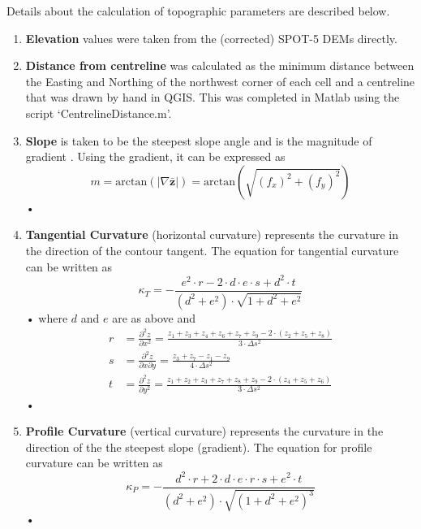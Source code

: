 \documentclass[12pt]{article}
\renewcommand{\vector}[1]{\mathbf{#1}}
\begin{document}
Details about the calculation of topographic parameters are described below.
\begin{enumerate}
\item[]\textbf{Elevation} values were taken from the (corrected) SPOT-5 DEMs directly.

\item[] \textbf{Distance from centreline} was calculated as the minimum distance between the Easting and Northing of the northwest corner of each cell and a centreline that was drawn by hand in QGIS. This was completed in Matlab using the script `CentrelineDistance.m'. 

\item[]  \textbf{Slope} is taken to be the steepest slope angle and is the magnitude of gradient \citep{Mitavsova1993}. Using the gradient, it can be expressed as  \citep{Olaya2009}
	\begin{equation}
	m = \textrm{arctan}(|\nabla \bar{ \vector{z}}|) = \textrm{arctan} \left( \sqrt{(f_x)^2 +( f_y)^2} \right)
	\end{equation}•
\item[] \textbf{Tangential Curvature} (horizontal curvature) represents the curvature in the direction of the contour tangent. The equation for tangential curvature can be written as \citep{Olaya2009}
	\begin{equation}
	\kappa_T = - \frac{e^2 \cdot r -2 \cdot d\cdot e \cdot s +d^2 \cdot t}{(d^2+e^2) \cdot \sqrt{1+d^2+e^2}}
	\end{equation}•
where $d$ and $e$ are as above and
	\begin{align}
	r &= \frac{\partial^2 z}{\partial x^2} = \frac{z_1+z_3+z_4+z_6+z_7+z_9-2 \cdot (z_2+z_5+z_8)}{3 \cdot \Delta s^2}\\
	s &= \frac{\partial^2 z}{\partial x \partial y} = \frac{z_3 + z_7- z_1 - z_9}{4 \cdot \Delta s^2}\\
	t &= \frac{\partial^2 z}{\partial y^2} = \frac{z_1+z_2+z_3+z_7+z_8+z_9-2 \cdot (z_4+z_5+z_6)}{3 \cdot \Delta s^2}
	\end{align}•	

\item[] \textbf{Profile Curvature} (vertical curvature) represents the curvature in the direction of the the steepest slope (gradient). The equation for profile curvature can be written as \citep{Olaya2009}
	\begin{equation}
	\kappa_P = - \frac{d^2 \cdot r +2 \cdot d\cdot e \cdot r \cdot s +e^2 \cdot t}{(d^2+e^2) \cdot \sqrt{(1+d^2+e^2)^3}}
	\end{equation}•


\end{enumerate}
\end{document}
